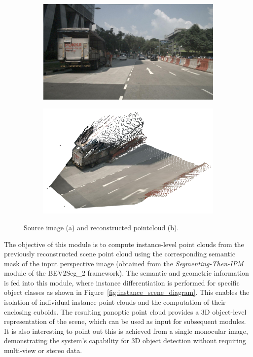\begin{figure}[!ht]
    \centering
    \begin{subfigure}[b]{0.45\textwidth}
        \includegraphics[width=\textwidth]{images/methodology/raw_image_0.jpg}
        \caption{}
        \label{fig:raw_pointcloud_a}
    \end{subfigure}
    \hfill
    \begin{subfigure}[b]{0.45\textwidth}
        \includegraphics[width=\textwidth]{images/methodology/pcd_raw.png}
        \caption{}
        \label{fig:raw_pointcloud_b}
    \end{subfigure}

    \caption{Source image (a) and reconstructed pointcloud (b).}
    \label{fig:raw_pointcloud}
\end{figure}

The objective of this module is to compute instance-level point clouds from the previously reconstructed scene point cloud using the corresponding semantic mask of the input perspective image (obtained from the \textit{Segmenting-Then-IPM} module of the BEV2Seg\_2 framework). The semantic and geometric information is fed into this module, where instance differentiation is performed for specific object classes as shown in Figure~\ref{fig:instance_scene_diagram}. This enables the isolation of individual instance point clouds and the computation of their enclosing cuboids. The resulting panoptic point cloud provides a 3D object-level representation of the scene, which can be used as input for subsequent modules. It is also interesting to point out this is achieved from a single monocular image, demonstrating the system's capability for 3D object detection without requiring multi-view or stereo data.

